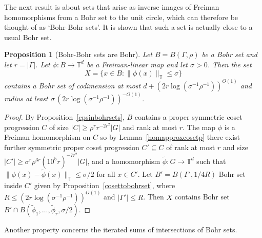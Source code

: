\documentclass[a4paper,11pt]{article}
\numberwithin{theorem}{section}
\newtheorem{proposition}[theorem]{Proposition}
\theoremstyle{definition}
\newcommand{\uc}[1]{
    \|#1\|_{\mathbb{T}}
}
\begin{document}
\vspace{\baselineskip}

The next result is about sets that arise as inverse images of Freiman homomorphisms from a Bohr set to the unit circle, which can therefore be thought of as `Bohr-Bohr sets'. It is shown that such a set is actually close to a usual Bohr set.

\vspace{\baselineskip}

\begin{proposition}[Bohr-Bohr sets are Bohr]\label{bohrbohr}
    Let $B = B(\Gamma, \rho)$ be a Bohr set and let $r = |\Gamma|$. Let $\phi : B \to \mathbb{T}^d$ be a Freiman-linear map and let $\sigma > 0$. Then the set
    \[X = \{x \in B: \uc{\phi(x)} \leq \sigma\}\]
    contains a Bohr set of codimension at most $d + (2r \log (\sigma^{-1} \rho^{-1}))^{O(1)}$ and radius at least $\sigma\,(2r \log (\sigma^{-1} \rho^{-1}))^{-O(1)}$.
\end{proposition}

\begin{proof}
    By Proposition~\ref{cpsinbohrsets}, $B$ contains a proper symmetric coset progression $C$ of size $|C| \geq \rho^r r^{-2r^2}|G|$ and rank at most $r$. The map $\phi$ is a Freiman homomorphism on $C$ so by Lemma~\ref{homapproxcosetp} there exist further symmetric proper coset progression $C' \subseteq C$ of rank at most $r$ and size $|C'| \geq \sigma^r \rho^{3r} (10^5 r)^{-7r^2} |G|$, and a homomorphism $\tilde{\phi} : G \to \mathbb{T}^d$ such that $\uc{\phi(x) - \tilde{\phi}(x)} \leq \sigma/2$ for all $x \in C'$. Let $B' = B(\Gamma', 1/4R)$ Bohr set inside $C'$ given by Proposition~\ref{cosettobohrset}, where $R \leq (2r \log (\sigma^{-1} \rho^{-1}))^{O(1)}$ and $|\Gamma'| \leq R$. Then $X$ contains Bohr set $B' \cap B(\tilde{\phi}_1, \dots, \tilde{\phi}_r, \sigma/2)$.
\end{proof}

\vspace{\baselineskip}

Another property concerns the iterated sums of intersections of Bohr sets. 

\vspace{\baselineskip}
\end{document}
